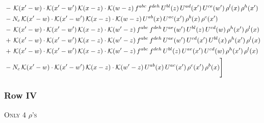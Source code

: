 \documentclass[9pt]{article}
\numberwithin{equation}{section}
\begin{document}
\begin{align}
& -\,\mathcal{K}(x'-w)\cdot\mathcal{K}(x'-w')\,\mathcal{K}(x-z)\cdot\mathcal{K}(w-z)\,f^{abc}\,f^{deh}\,U^{bl}(z)\,U^{ad}(x')\,U^{ce}(w')\,\rho^{l}(x)\,\rho^{h}(x')\notag\\
& -N_{c}\,\mathcal{K}(x'-w)\cdot\mathcal{K}(x'-w')\,\mathcal{K}(x-z)\cdot\mathcal{K}(w-z)\,U^{ab}(x)\,U^{ac}(x')\,\rho^{b}(x)\,\rho^{c}(x')\notag\\
& -\,\mathcal{K}(x'-w)\cdot\mathcal{K}(x'-w')\,\mathcal{K}(x-z)\cdot\mathcal{K}(w'-z)\,f^{abc}\,f^{deh}\,U^{ae}(w')\,U^{bl}(z)\,U^{cd}(w)\,\rho^{h}(x')\,\rho^{l}(x)\notag\\
& +\,\mathcal{K}(x'-w)\cdot\mathcal{K}(x'-w')\,\mathcal{K}(x-z)\cdot\mathcal{K}(w'-z)\,f^{abc}\,f^{deh}\,U^{ae}(w')\,U^{cd}(x')\,U^{bl}(x)\,\rho^{h}(x')\,\rho^{l}(x)\notag\\
& +\,\mathcal{K}(x'-w)\cdot\mathcal{K}(x'-w')\,\mathcal{K}(x-z)\cdot\mathcal{K}(w'-z)\,f^{abc}\,f^{deh}\,U^{bl}(z)\,U^{ae}(x')\,U^{cd}(w)\,\rho^{h}(x')\,\rho^{l}(x)\notag\\
& -N_{c}\,\mathcal{K}(x'-w)\cdot\mathcal{K}(x'-w')\,\mathcal{K}(x-z)\cdot\mathcal{K}(w'-z)\,U^{ab}(x)\,U^{ac}(x')\,\rho^{c}(x')\,\rho^{b}(x)\Bigg]
\end{align}
\subsubsection{Row IV}
\textsc{Only 4 $\rho$'s}
\end{document}
